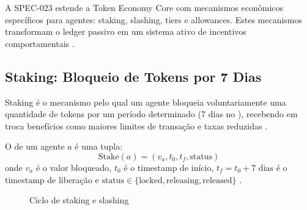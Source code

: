 A SPEC-023 estende a Token Economy Core com mecanismos econômicos
específicos para agentes: staking, slashing, tiers e allowances.
Estes mecanismos transformam o ledger passivo em um sistema ativo
de incentivos comportamentais \cite{opencode2026token}.

\subsection{Staking: Bloqueio de Tokens por 7 Dias}

Staking é o mecanismo pelo qual um agente bloqueia voluntariamente
uma quantidade de tokens por um período determinado (7 dias no
\opencodeeco{}), recebendo em troca benefícios como maiores
limites de transação e taxas reduzidas \cite{opencode2026token,
buterin2014next}.

\begin{definicao}[Staking]
O  de um agente $a$ é uma tupla:
\[
\text{Stake}(a) = (v_a, t_0, t_f, \text{status})
\]
onde $v_a$ é o valor bloqueado, $t_0$ é o timestamp de início,
$t_f = t_0 + 7\text{ dias}$ é o timestamp de liberação e
$\text{status} \in \{\text{locked}, \text{releasing}, \text{released}\}$
\cite{opencode2026token}.
\end{definicao}

\begin{figure}[htb]
\centering
\caption{Ciclo de staking e slashing}
\label{fig:staking-slashing}
\end{figure}

